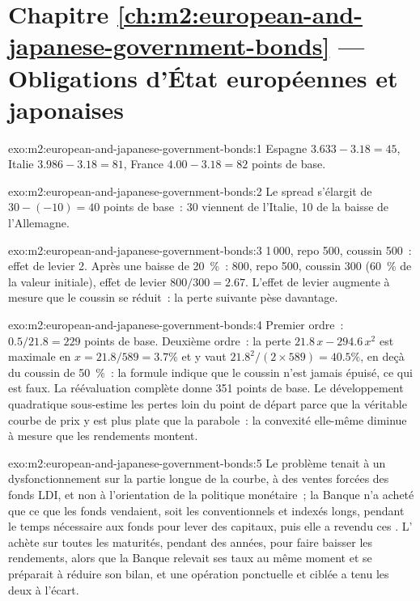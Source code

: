 \section*{Chapitre \ref{ch:m2:european-and-japanese-government-bonds} --- Obligations d'État européennes et japonaises}

\begin{solution}{exo:m2:european-and-japanese-government-bonds:1}
Espagne $3.633 - 3.18 = 45$, Italie $3.986 - 3.18 = 81$, France $4.00 - 3.18 = 82$
points de base.
\end{solution}

\begin{solution}{exo:m2:european-and-japanese-government-bonds:2}
Le spread s'élargit de $30 - (-10) = 40$ points de base~: 30 viennent de l'Italie, 10
de la baisse de l'Allemagne.
\end{solution}

\begin{solution}{exo:m2:european-and-japanese-government-bonds:3}
 1\,000, repo 500, coussin 500~: effet de levier 2. Après une baisse de 20~\%~:  800,
repo 500, coussin 300 (60~\% de la valeur initiale), effet de levier $800/300 = 2.67$. L'effet
de levier augmente à mesure que le coussin se réduit~: la perte suivante pèse davantage.
\end{solution}

\begin{solution}{exo:m2:european-and-japanese-government-bonds:4}
Premier ordre~: $0.5/21.8 = 229$ points de base. Deuxième ordre~: la perte $21.8\,x -
294.6\,x^2$ est maximale en $x = 21.8/589 = 3.7\%$ et y vaut $21.8^2/(2
\times 589) = 40.5\%$, en deçà du coussin de 50~\%~: la formule indique que le coussin
n'est jamais épuisé, ce qui est faux. La réévaluation complète donne 351 points de base. Le
développement quadratique sous-estime les pertes loin du point de départ parce que la véritable
courbe de prix y est plus plate que la parabole~: la convexité elle-même diminue à mesure que
les rendements montent.
\end{solution}

\begin{solution}{exo:m2:european-and-japanese-government-bonds:5}
Le problème tenait à un dysfonctionnement sur la partie longue de la courbe, à des ventes forcées des fonds LDI,
et non à l'orientation de la politique monétaire~; la Banque n'a acheté que ce que les fonds
vendaient, soit les  conventionnels et indexés longs, pendant le temps
nécessaire aux fonds pour lever des capitaux, puis elle a revendu ces . L'
achète sur toutes les maturités, pendant des années, pour faire baisser les rendements, alors que la
Banque relevait ses taux au même moment et se préparait à réduire son bilan, et une opération
ponctuelle et ciblée a tenu les deux à l'écart.
\end{solution}

